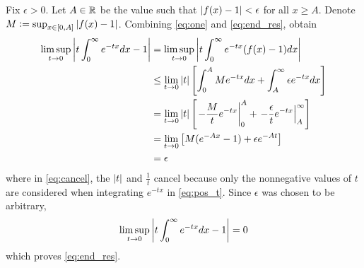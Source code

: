 \documentclass[12pt]{article}
\begin{document}
Fix $\epsilon > 0$. 
Let $A \in \mathbb{R}$ be the value such that $\left|f(x) - 1\right| < \epsilon$ for all $x \geq A$. 
Denote $M \vcentcolon= \sup_{x \in [0, A]} \left|f(x) - 1\right|$. 
Combining \eqref{eq:one} and \eqref{eq:end_res}, obtain 
\begin{align}
  \limsup_{t \rightarrow 0} \left|t \int_{0}^{\infty} e^{-tx} dx - 1\right| 
  & = \limsup_{t \rightarrow 0} \left|t \int_{0}^{\infty} e^{-tx} (f(x) - 1)dx\right| \nonumber \\ 
  & \leq \lim_{t \rightarrow 0} \left|t\right| \left[ \int_{0}^{A} M e^{-tx} dx + \int_{A}^{\infty} \epsilon e^{-tx}dx \right] \label{eq:pos_t} \\ 
  & = \lim_{t \rightarrow 0} \left|t\right| \left[ \left.-\frac{M}{t}e^{-tx} \right|_{0}^{A} + \left. -\frac{\epsilon}{t}e^{-tx}\right|_{A}^{\infty}\right] \nonumber \\ 
  & = \lim_{t \rightarrow 0} \left[M(e^{-Ax} - 1) + \epsilon e^{-At} \right] \label{eq:cancel} \\
  & = \epsilon \nonumber
\end{align}
where in \eqref{eq:cancel}, the $\left|t\right|$ and $\frac{1}{t}$ cancel because only the nonnegative values of $t$ are considered when integrating $e^{-tx}$ in \eqref{eq:pos_t}. 
Since $\epsilon$ was chosen to be arbitrary, 
$$\limsup_{t \rightarrow 0} \left|t \int_{0}^{\infty} e^{-tx} dx - 1\right| = 0$$
which proves \eqref{eq:end_res}. 
\end{document}
